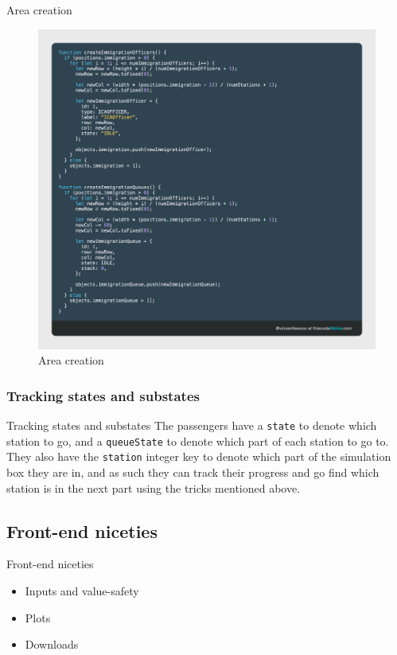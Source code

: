 \documentclass{beamer}
\begin{document}
\begin{frame}{Area creation}
	\begin{figure}
		\includegraphics[scale=0.1]{../img/create-a-station-and-its-queues}\caption{Area creation}
	\end{figure}
\end{frame}

\subsubsection*{Tracking states and substates}
\begin{frame}{Tracking states and substates}
	The passengers have a \texttt{state} to denote which station to go, and a \texttt{queueState} to denote which part of each station to go to. They also have the \texttt{station} integer key to denote which part of the simulation box they are in, and as such they can track their progress and go find which station is in the next part using the tricks mentioned above.
\end{frame}

\subsection{Front-end niceties}
\begin{frame}{Front-end niceties}
	\begin{itemize}
		\item Inputs and value-safety
		\item Plots
		\item Downloads
	\end{itemize}
\end{frame}
\end{document}

